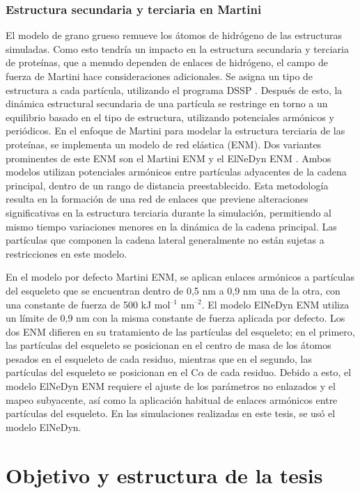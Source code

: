 \subsubsection{Estructura secundaria y terciaria en Martini}

El modelo de grano grueso remueve los átomos de hidrógeno de las estructuras simuladas. Como esto tendría un impacto en la estructura secundaria y terciaria de proteínas, que a menudo dependen de enlaces de hidrógeno, el campo de fuerza de Martini hace consideraciones adicionales.
Se asigna un tipo de estructura a cada partícula, utilizando el programa DSSP \citep{Kabsch1983}. Después de esto, la dinámica estructural secundaria de una partícula se restringe en torno a un equilibrio basado en el tipo de estructura, utilizando potenciales armónicos y periódicos.
En el enfoque de Martini para modelar la estructura terciaria de las proteínas, se implementa un modelo de red elástica (ENM). Dos variantes prominentes de este ENM son el Martini ENM y el ElNeDyn ENM \citep{Periole2009}. Ambos modelos utilizan potenciales armónicos entre partículas adyacentes de la cadena principal, dentro de un rango de distancia preestablecido. Esta metodología resulta en la formación de una red de enlaces que previene alteraciones significativas en la estructura terciaria durante la simulación, permitiendo al mismo tiempo variaciones menores en la dinámica de la cadena principal. Las partículas que componen la cadena lateral generalmente no están sujetas a restricciones en este modelo.

En el modelo por defecto Martini ENM, se aplican enlaces armónicos a partículas del esqueleto que se encuentran dentro de 0,5 nm a 0,9 nm una de la otra, con una constante de fuerza de 500 kJ mol$^{\text{--1}}$ nm$^{\text{--2}}$. El modelo ElNeDyn ENM utiliza un límite de 0,9 nm con la misma constante de fuerza aplicada por defecto. Los dos ENM difieren en su tratamiento de las partículas del esqueleto; en el primero, las partículas del esqueleto se posicionan en el centro de masa de los átomos pesados en el esqueleto de cada residuo, mientras que en el segundo, las partículas del esqueleto se posicionan en el C$\alpha$ de cada residuo. Debido a esto, el modelo ElNeDyn ENM requiere el ajuste de los parámetros no enlazados y el mapeo subyacente, así como la aplicación habitual de enlaces armónicos entre partículas del esqueleto. En las simulaciones realizadas en este tesis, se usó el modelo ElNeDyn.

\section{Objetivo y estructura de la tesis}

